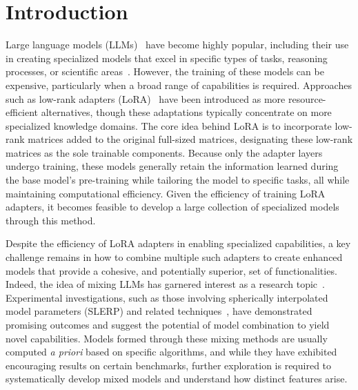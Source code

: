 \section{Introduction}  
Large language models (LLMs)~\cite{Vaswani2017AttentionNeedc,Touvron2023LlamaModels,OpenAI2023GPT-4Report,Chowdhery2022PaLM:Pathways,Jiang2023Mistral7B,Gunasekar2023TextbooksNeed} have become highly popular, including their use in creating specialized models that excel in specific types of tasks, reasoning processes, or scientific areas~\cite{Bubeck2023SparksGPT-4,Buehler2023MechGPTModalities,Nejjar2023LLMsAnalysis,Buehler2023GenerativeDesign,Luu2023BioinspiredLLM:Materials,Luu2023GenerativeSolvents,Buehler2023MeLMProblemsb,Ge2023OpenAGI:Experts}. However, the training of these models can be expensive, particularly when a broad range of capabilities is required. Approaches such as low-rank adapters (LoRA)~\cite{hu2021lora} have been introduced as more resource-efficient alternatives, though these adaptations typically concentrate on more specialized knowledge domains. The core idea behind LoRA is to incorporate low-rank matrices added to the original full-sized matrices, designating these low-rank matrices as the sole trainable components. Because only the adapter layers undergo training, these models generally retain the information learned during the base model’s pre-training while tailoring the model to specific tasks, all while maintaining computational efficiency. Given the efficiency of training LoRA adapters, it becomes feasible to develop a large collection of specialized models through this method.  

Despite the efficiency of LoRA adapters in enabling specialized capabilities, a key challenge remains in how to combine multiple such adapters to create enhanced models that provide a cohesive, and potentially superior, set of functionalities. Indeed, the idea of mixing LLMs has garnered interest as a research topic~\cite{Kim2023SOLARUp-Scaling}. Experimental investigations, such as those involving spherically interpolated model parameters (SLERP) and related techniques~\cite{Arcee-ai/mergekit:Models.}, have demonstrated promising outcomes and suggest the potential of model combination to yield novel capabilities. Models formed through these mixing methods are usually computed {\it a priori} based on specific algorithms, and while they have exhibited encouraging results on certain benchmarks, further exploration is required to systematically develop mixed models and understand how distinct features arise.


